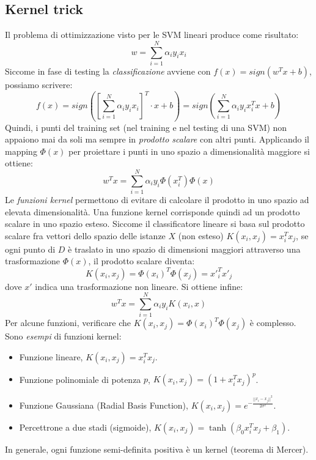 \documentclass[a4paper,oneside,titlepage]{book}
\begin{document}
\subsection{Kernel trick}
Il problema di ottimizzazione visto per le SVM lineari produce come risultato:
\[ w = \sum_{i=1}^N \alpha_i y_i x_i \]
Siccome in fase di testing la \textit{classificazione} avviene con $f(x)=sign(w^Tx+b)$, possiamo scrivere:
\[ f(x) = sign \left( \left[ \sum_{i=1}^N \alpha_i y_i x_i \right]^T \cdot x + b \right) = sign \left( \sum_{i=1}^N \alpha_i y_i x_i^T x + b \right) \]
Quindi, i punti del training set (nel training e nel testing di una SVM) non appaiono mai da soli ma sempre in \textit{prodotto scalare} con altri punti. Applicando il mapping $\Phi(x)$ per proiettare i punti in uno spazio a dimensionalità maggiore si ottiene:
\[ w^Tx = \sum_{i=1}^N \alpha_i y_i \Phi(x_i^T) \Phi(x) \]
Le \textit{funzioni kernel} permettono di evitare di calcolare il prodotto in uno spazio ad elevata dimensionalità. Una funzione kernel corrisponde quindi ad un prodotto scalare in uno spazio esteso. Siccome il classificatore lineare si basa sul prodotto scalare fra vettori dello spazio delle istanze $X$ (non esteso) $K(x_i,x_j) = x_i^T x_j$, se ogni punto di $D$ è traslato in uno spazio di dimensioni maggiori attraverso una trasformazione $\Phi(x)$, il prodotto scalare diventa:
\[ K(x_i,x_j) = \Phi(x_i)^T \Phi(x_j) = x'^T_i x'_j \]
dove $x'$ indica una trasformazione non lineare. Si ottiene infine:
\[ w^Tx = \sum_{i=1}^N \alpha_i y_i K(x_i,x) \]
Per alcune funzioni, verificare che $K(x_i,x_j) = \Phi(x_i)^T \Phi(x_j)$ è complesso. Sono \textit{esempi} di funzioni kernel:
\begin{itemize}
    \item Funzione lineare, $K(x_i,x_j) = x_i^T x_j$.
    \item Funzione polinomiale di potenza $p$, $K(x_i,x_j) = (1 + x_i^T x_j)^p$.
    \item Funzione Gaussiana (Radial Basis Function), $K(x_i,x_j) = e^{- \frac{||x_i-x_j||^2}{2 \sigma^2}}$.
    \item Percettrone a due stadi (sigmoide), $K(x_i,x_j) = \tanh (\beta_0 x_i^T x_j + \beta_1)$.
\end{itemize}
In generale, ogni funzione semi-definita positiva è un kernel (teorema di Mercer).

\newpage
\end{document}
